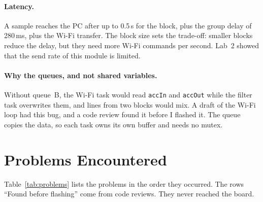 \documentclass[11pt,a4paper]{article}
\begin{document}
\paragraph{Latency.}
A sample reaches the PC after up to 0.5\,s for the block, plus the
group delay of 280\,ms, plus the Wi-Fi transfer. The block size sets the
trade-off: smaller blocks reduce the delay, but they need more Wi-Fi
commands per second. Lab~2 showed that the send rate of this module is
limited.

\paragraph{Why the queues, and not shared variables.}
Without queue~B, the Wi-Fi task would read \texttt{accIn} and \texttt{accOut}
while the filter task overwrites them, and lines from two blocks would mix. A
draft of the Wi-Fi loop had this bug, and a code review found it before I
flashed it. The queue copies the data, so each task owns its own buffer and
needs no mutex.

\section{Problems Encountered}

Table~\ref{tab:problems} lists the problems in the order they occurred. The
rows ``Found before flashing'' come from code reviews. They never reached the
board.
\end{document}
